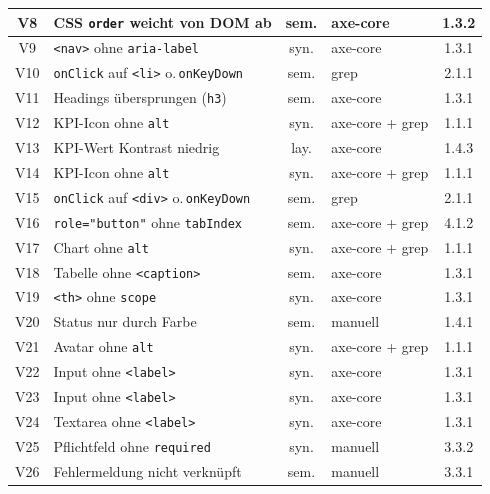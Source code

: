 \begin{longtable}{|c|p{5.8cm}|c|p{3.6cm}|c|}
V8   & CSS \texttt{order} weicht von DOM ab      & sem. & axe-core                & 1.3.2 \\ \hline
V9   & \texttt{<nav>} ohne \texttt{aria-label}   & syn. & axe-core                & 1.3.1 \\ \hline
V10  & \texttt{onClick} auf \texttt{<li>} o.\,\texttt{onKeyDown} & sem. & grep & 2.1.1 \\ \hline
V11  & Headings übersprungen (\texttt{h3})       & sem. & axe-core                & 1.3.1 \\ \hline
V12  & KPI-Icon ohne \texttt{alt}                & syn. & axe-core + grep         & 1.1.1 \\ \hline
V13  & KPI-Wert Kontrast niedrig                 & lay. & axe-core                & 1.4.3 \\ \hline
V14  & KPI-Icon ohne \texttt{alt}                & syn. & axe-core + grep         & 1.1.1 \\ \hline
V15  & \texttt{onClick} auf \texttt{<div>} o.\,\texttt{onKeyDown} & sem. & grep & 2.1.1 \\ \hline
V16  & \texttt{role="button"} ohne \texttt{tabIndex} & sem. & axe-core + grep    & 4.1.2 \\ \hline
V17  & Chart ohne \texttt{alt}                   & syn. & axe-core + grep         & 1.1.1 \\ \hline
V18  & Tabelle ohne \texttt{<caption>}           & sem. & axe-core                & 1.3.1 \\ \hline
V19  & \texttt{<th>} ohne \texttt{scope}         & syn. & axe-core                & 1.3.1 \\ \hline
V20  & Status nur durch Farbe                    & sem. & manuell                 & 1.4.1 \\ \hline
V21  & Avatar ohne \texttt{alt}                  & syn. & axe-core + grep         & 1.1.1 \\ \hline
V22  & Input ohne \texttt{<label>}               & syn. & axe-core                & 1.3.1 \\ \hline
V23  & Input ohne \texttt{<label>}               & syn. & axe-core                & 1.3.1 \\ \hline
V24  & Textarea ohne \texttt{<label>}            & syn. & axe-core                & 1.3.1 \\ \hline
V25  & Pflichtfeld ohne \texttt{required}        & syn. & manuell                 & 3.3.2 \\ \hline
V26  & Fehlermeldung nicht verknüpft             & sem. & manuell                 & 3.3.1 \\ \hline

\end{longtable}
